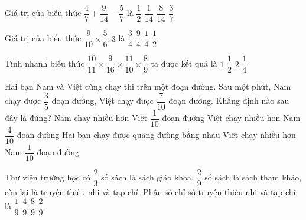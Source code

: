\begin{ex} %
Giá trị của biểu thức $\dfrac{4}{7} + \dfrac{9}{14} - \dfrac{5}{7}$ là
\choice
{\True $\dfrac{1}{2}$}
{$\dfrac{1}{14}$}
{$\dfrac{8}{14}$}
{$\dfrac{3}{7}$}
\end{ex}

\begin{ex} %
Giá trị của biểu thức $\dfrac{9}{10} \times \dfrac{5}{6} : 3$ là
\choice
{$\dfrac{3}{4}$}
{$\dfrac{9}{4}$}
{\True $\dfrac{1}{4}$}
{$\dfrac{1}{2}$}
\end{ex}

\begin{ex} %
Tính nhanh biểu thức $\dfrac{10}{11} \times \dfrac{9}{16} \times \dfrac{11}{10} \times \dfrac{8}{9}$ ta được kết quả là
\choice
{$1$}
{\True $\dfrac{1}{2}$}
{$2$}
{$\dfrac{1}{4}$}
\end{ex}

\begin{ex} %
Hai bạn Nam và Việt cùng chạy thi trên một đoạn đường. Sau một phút, Nam chạy được $\dfrac{3}{5}$ đoạn đường, Việt chạy được $\dfrac{7}{10}$ đoạn đường. Khẳng định nào sau đây là đúng?
\choice
{Nam chạy nhiều hơn Việt $\dfrac{1}{10}$ đoạn đường}
{Việt chạy nhiều hơn Nam $\dfrac{4}{10}$ đoạn đường}
{Hai bạn chạy được quãng đường bằng nhau}
{\True Việt chạy nhiều hơn Nam $\dfrac{1}{10}$ đoạn đường}
\end{ex}

\begin{ex} %
Thư viện trường học có $\dfrac{2}{3}$ số sách là sách giáo khoa, $\dfrac{2}{9}$ số sách là sách tham khảo, còn lại là truyện thiếu nhi và tạp chí. Phân số chỉ số truyện thiếu nhi và tạp chí là
\choice
{\True $\dfrac{1}{9}$}
{$\dfrac{4}{9}$}
{$\dfrac{8}{9}$}
{$\dfrac{2}{9}$}
\end{ex}


